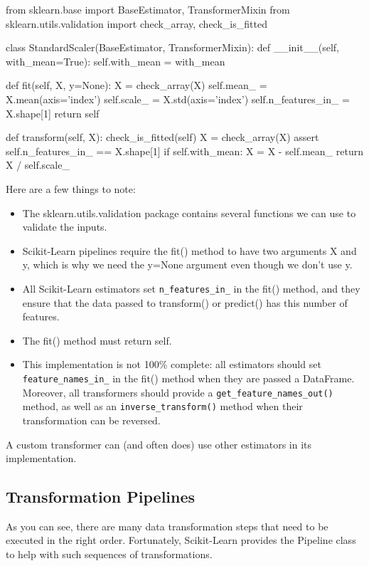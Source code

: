 \begin{pyc}
from sklearn.base import BaseEstimator, TransformerMixin
from sklearn.utils.validation import check_array, check_is_fitted

class StandardScaler(BaseEstimator, TransformerMixin):
    def __init__(self, with_mean=True):
        self.with_mean = with_mean
        
    def fit(self, X, y=None):
        X = check_array(X)
        self.mean_ = X.mean(axis='index')
        self.scale_ = X.std(axis='index')
        self.n_features_in_ = X.shape[1]
        return self

    def transform(self, X):
        check_is_fitted(self)
        X = check_array(X)
        assert self.n_features_in_ == X.shape[1]
        if self.with_mean:
            X = X - self.mean_
        return X / self.scale_
\end{pyc}

Here are a few things to note:
\begin{itemize}
    \item The sklearn.utils.validation package contains several functions we can use to validate the inputs.
    \item Scikit-Learn pipelines require the fit() method to have two arguments X and y,
    which is why we need the y=None argument even though we don't use y.
    \item All Scikit-Learn estimators set \verb|n_features_in_| in the fit() method, and they
    ensure that the data passed to transform() or predict() has this number of
    features.
    \item The fit() method must return self.

    \item This implementation is not 100\% complete: all estimators should set
    \verb|feature_names_in_| in the fit() method when they are passed a DataFrame.
    Moreover, all transformers should provide a \verb|get_feature_names_out()| method,
    as well as an \verb|inverse_transform()| method when their transformation can be
    reversed.
\end{itemize}

A custom transformer can (and often does) use other estimators in its implementation.


\subsection{Transformation Pipelines}
As you can see, there are many data transformation steps that need to be executed
in the right order. Fortunately, Scikit-Learn provides the Pipeline class to help with
such sequences of transformations.

